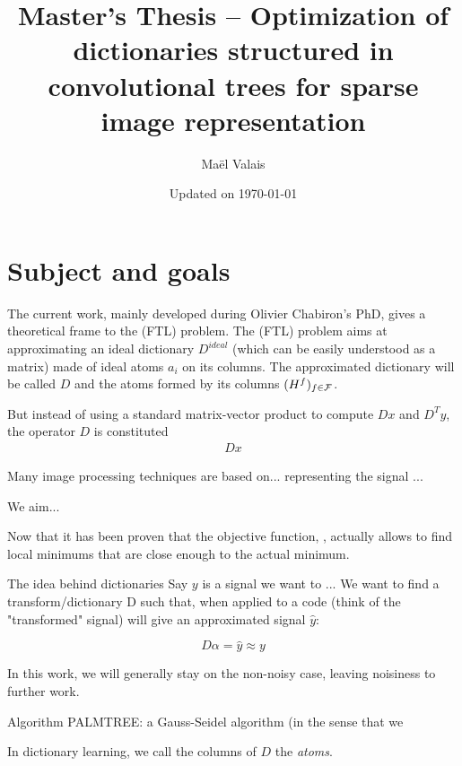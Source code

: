 \author{Maël Valais}
\date{Updated on \today}
\title{Master's Thesis – Optimization of dictionaries structured in convolutional trees for sparse image representation}


\section{Subject and goals}

The current work, mainly developed during Olivier Chabiron's PhD, gives a theoretical frame to the (FTL) problem. The (FTL) problem aims at approximating an ideal dictionary $D^{ideal}$ (which can be easily understood as a matrix) made of ideal atoms $a_i$ on its columns. The approximated dictionary will be called $D$ and the atoms formed by its columns $(H^f)_{f \in \mathcal F}$. 

But instead of using a standard matrix-vector product to compute $Dx$ and $D^Ty$, the operator $D$ is constituted 
\begin{equation*} \begin{aligned}
Dx
\end{aligned} \end{equation*}

Many image processing techniques are based on... representing the signal ...

We aim... 

Now that it has been proven that the objective function, , actually allows to find local minimums that are close enough to the actual minimum.


The idea behind dictionaries
Say $y$ is a signal we want to ...
We want to find a transform/dictionary D such that, when applied to a code (think of the "transformed" signal) will give an approximated signal $\hat{y}$:

$$D\alpha=\hat{y} \approx y$$

In this work, we will generally stay on the non-noisy case, leaving noisiness to further work.

Algorithm PALMTREE: a Gauss-Seidel algorithm (in the sense that we 

In dictionary learning, we call the columns of $D$ the \emph{atoms}.


